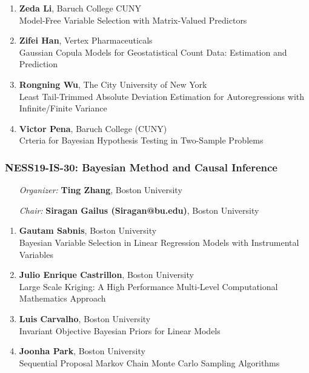 \begin{enumerate}
\item \textbf{Zeda Li}, Baruch College CUNY \\
Model-Free Variable Selection with Matrix-Valued Predictors
\item \textbf{Zifei Han}, Vertex Pharmaceuticals \\
Gaussian Copula Models for Geostatistical Count Data: Estimation and Prediction
\item \textbf{Rongning Wu}, The City University of New York \\
Least Tail-Trimmed Absolute Deviation Estimation for Autoregressions with Infinite/Finite Variance
\item \textbf{Victor Pena}, Baruch College (CUNY) \\
Crteria for Bayesian Hypothesis Testing in Two-Sample Problems
\end{enumerate}

\subsubsection*{NESS19-IS-30: Bayesian Method and Causal Inference}

\begin{enumerate}[align=left]
\item [\emph{Organizer:}] \textbf{Ting Zhang}, Boston University
\item [\emph{Chair:}] \textbf{Siragan Gailus (Siragan@bu.edu)},  Boston University
\end{enumerate}

\begin{enumerate}
\item \textbf{Gautam Sabnis}, Boston University \\
Bayesian Variable Selection in Linear Regression Models with Instrumental Variables
\item \textbf{Julio Enrique Castrillon}, Boston University \\
Large Scale Kriging: A High Performance Multi-Level Computational Mathematics Approach
\item \textbf{Luis Carvalho}, Boston University \\
Invariant Objective Bayesian Priors for Linear Models
\item \textbf{Joonha Park}, Boston University \\
Sequential Proposal Markov Chain Monte Carlo Sampling Algorithms
\end{enumerate}

